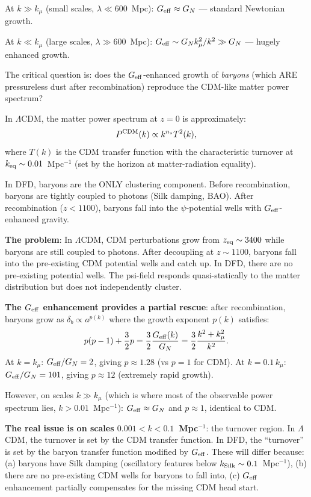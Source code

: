 \documentclass[11pt]{article}
\newcommand{\LCDM}{$\Lambda$CDM}
\newcommand{\Geff}{G_{\rm eff}}
\newcommand{\kmu}{k_\mu}
\begin{document}
\begin{tcolorbox}[colback=red!5!white, colframe=red!70!black,
  title=\textbf{W4i17 TOP 5 FINDINGS --- EXISTENTIAL AUDIT: DUST BRANCH CLUSTERING}]
\begin{enumerate}
  At $k \gg \kmu$ (small scales, $\lambda \ll 600$~Mpc):
  $\Geff \approx G_N$ --- standard Newtonian growth.

  At $k \ll \kmu$ (large scales, $\lambda \gg 600$~Mpc):
  $\Geff \sim G_N \kmu^2/k^2 \gg G_N$ --- hugely enhanced growth.

  The critical question is: does the $\Geff$-enhanced growth of
  \emph{baryons} (which ARE pressureless dust after recombination)
  reproduce the CDM-like matter power spectrum?

  In \LCDM, the matter power spectrum at $z = 0$ is approximately:
  \begin{equation}
  P^{\rm CDM}(k) \propto k^{n_s} T^2(k),
  \end{equation}
  where $T(k)$ is the CDM transfer function with the characteristic
  turnover at $k_{\rm eq} \sim 0.01$~Mpc$^{-1}$ (set by the horizon
  at matter-radiation equality).

  In DFD, baryons are the ONLY clustering component. Before
  recombination, baryons are tightly coupled to photons (Silk
  damping, BAO). After recombination ($z < 1100$), baryons fall
  into the $\psi$-potential wells with $\Geff$-enhanced gravity.

  \textbf{The problem}: In \LCDM, CDM perturbations grow from
  $z_{\rm eq} \sim 3400$ while baryons are still coupled to photons.
  After decoupling at $z \sim 1100$, baryons fall into the
  pre-existing CDM potential wells and catch up. In DFD, there are
  no pre-existing potential wells. The psi-field responds
  quasi-statically to the matter distribution but does not
  independently cluster.

  \textbf{The $\Geff$ enhancement provides a partial rescue}:
  after recombination, baryons grow as
  $\delta_b \propto a^{p(k)}$ where the growth exponent $p(k)$
  satisfies:
  \begin{equation}
  p(p-1) + \frac{3}{2}p = \frac{3}{2}\frac{\Geff(k)}{G_N}
  = \frac{3}{2}\frac{k^2 + \kmu^2}{k^2}.
  \end{equation}
  At $k = \kmu$: $\Geff/G_N = 2$, giving $p \approx 1.28$
  (vs $p = 1$ for CDM). At $k = 0.1\,\kmu$: $\Geff/G_N = 101$,
  giving $p \approx 12$ (extremely rapid growth).

  However, on scales $k \gg \kmu$ (which is where most of the
  observable power spectrum lies, $k > 0.01$~Mpc$^{-1}$):
  $\Geff \approx G_N$ and $p \approx 1$, identical to CDM.

  \textbf{The real issue is on scales $0.001 < k < 0.1$~Mpc$^{-1}$}:
  the turnover region. In \LCDM, the turnover is set by the CDM
  transfer function. In DFD, the ``turnover'' is set by the baryon
  transfer function modified by $\Geff$. These will differ because:
  (a) baryons have Silk damping (oscillatory features below
  $k_{\rm Silk} \sim 0.1$~Mpc$^{-1}$),
  (b) there are no pre-existing CDM wells for baryons to fall into,
  (c) $\Geff$ enhancement partially compensates for the missing CDM
  head start.


\end{enumerate}
\end{tcolorbox}
\end{document}
